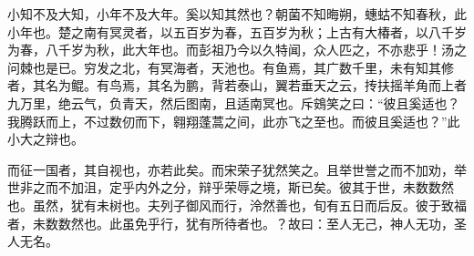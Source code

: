 小知不及大知，小年不及大年。奚以知其然也？朝菌不知晦朔，蟪蛄不知春秋，此小年也。楚之南有冥灵者，以五百岁为春，五百岁为秋；上古有大椿者，以八千岁为春，八千岁为秋，此大年也。而彭祖乃今以久特闻，众人匹之，不亦悲乎！汤之问棘也是已。穷发之北，有冥海者，天池也。有鱼焉，其广数千里，未有知其修者，其名为鲲。有鸟焉，其名为鹏，背若泰山，翼若垂天之云，抟扶摇羊角而上者九万里，绝云气，负青天，然后图南，且适南冥也。斥鴳笑之曰：“彼且奚适也？我腾跃而上，不过数仞而下，翱翔蓬蒿之间，此亦飞之至也。而彼且奚适也？”此小大之辩也。

而征一国者，其自视也，亦若此矣。而宋荣子犹然笑之。且举世誉之而不加劝，举世非之而不加沮，定乎内外之分，辩乎荣辱之境，斯已矣。彼其于世，未数数然也。虽然，犹有未树也。夫列子御风而行，泠然善也，旬有五日而后反。彼于致福者，未数数然也。此虽免乎行，犹有所待者也。？故曰：至人无己，神人无功，圣人无名。

\iffalse
只能用这个命令
来实现多行注释
\fi
